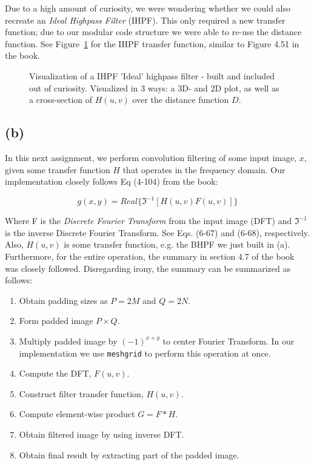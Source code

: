 \documentclass{article}
\begin{document}
Due to a high amount of curiosity, we were wondering whether we could also recreate an \textit{Ideal Highpass Filter} (IHPF). This only required a new transfer function; due to our modular code structure we were able to re-use the distance function. See Figure~\ref{fig:ihpf} for the IHPF transfer function, similar to Figure 4.51 in the book.

\begin{figure}[ht]
    \centering
    
    \caption{Visualization of a IHPF 'Ideal' highpass filter - built and included out of curiosity. Visualized in 3 ways: a 3D- and 2D plot, as well as a cross-section of $H(u, v)$ over the distance function $D$.}
    \label{fig:ihpf}
\end{figure}

\subsection*{(b)} In this next assignment, we perform convolution filtering of some input image, $x$, given some transfer function $H$ that operates in the frequency domain. Our implementation closely follows Eq (4-104) from the book:

\[
g(x, y) = Real\{\Im^{-1}[H(u,v)F(u, v)]\}
\]

Where F is the \textit{Discrete Fourier Transform} from the input image (DFT) and $\Im^{-1}$ is the inverse Discrete Fourier Transform. See Eqs. (6-67) and (6-68), respectively. Also, $H(u, v)$ is some transfer function, e.g. the BHPF we just built in (a). Furthermore, for the entire operation, the summary in section 4.7 of the book was closely followed. Disregarding irony, the summary can be summarized as follows:

\begin{enumerate}
    \item Obtain padding sizes as $P = 2M$ and $Q = 2N$.
    \item Form padded image $P \times Q$.
    \item Multiply padded image by $(-1)^{x+y}$ to center Fourier Transform. In our implementation we use \texttt{meshgrid} to perform this operation at once.
    \item Compute the DFT, $F(u, v)$.
    \item Construct filter transfer function, $H(u, v)$.
    \item Compute element-wise product $G = F * H$.
    \item Obtain filtered image by using inverse DFT.
    \item Obtain final result by extracting part of the padded image.
\end{enumerate}
\end{document}
